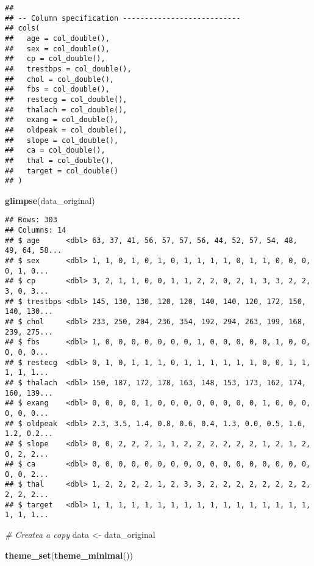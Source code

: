 \documentclass[
]{book}
\newenvironment{Shaded}{\begin{snugshade}}{\end{snugshade}}
\newcommand{\CommentTok}[1]{\textcolor[rgb]{0.56,0.35,0.01}{\textit{#1}}}
\newcommand{\KeywordTok}[1]{\textcolor[rgb]{0.13,0.29,0.53}{\textbf{#1}}}
\newcommand{\NormalTok}[1]{#1}
\newcommand{\StringTok}[1]{\textcolor[rgb]{0.31,0.60,0.02}{#1}}
\begin{document}
\begin{verbatim}
## 
## -- Column specification ---------------------------
## cols(
##   age = col_double(),
##   sex = col_double(),
##   cp = col_double(),
##   trestbps = col_double(),
##   chol = col_double(),
##   fbs = col_double(),
##   restecg = col_double(),
##   thalach = col_double(),
##   exang = col_double(),
##   oldpeak = col_double(),
##   slope = col_double(),
##   ca = col_double(),
##   thal = col_double(),
##   target = col_double()
## )
\end{verbatim}

\begin{Shaded}
\begin{Highlighting}[]
\KeywordTok{glimpse}\NormalTok{(data\_original)}
\end{Highlighting}
\end{Shaded}

\begin{verbatim}
## Rows: 303
## Columns: 14
## $ age      <dbl> 63, 37, 41, 56, 57, 57, 56, 44, 52, 57, 54, 48, 49, 64, 58...
## $ sex      <dbl> 1, 1, 0, 1, 0, 1, 0, 1, 1, 1, 1, 0, 1, 1, 0, 0, 0, 0, 1, 0...
## $ cp       <dbl> 3, 2, 1, 1, 0, 0, 1, 1, 2, 2, 0, 2, 1, 3, 3, 2, 2, 3, 0, 3...
## $ trestbps <dbl> 145, 130, 130, 120, 120, 140, 140, 120, 172, 150, 140, 130...
## $ chol     <dbl> 233, 250, 204, 236, 354, 192, 294, 263, 199, 168, 239, 275...
## $ fbs      <dbl> 1, 0, 0, 0, 0, 0, 0, 0, 1, 0, 0, 0, 0, 0, 1, 0, 0, 0, 0, 0...
## $ restecg  <dbl> 0, 1, 0, 1, 1, 1, 0, 1, 1, 1, 1, 1, 1, 0, 0, 1, 1, 1, 1, 1...
## $ thalach  <dbl> 150, 187, 172, 178, 163, 148, 153, 173, 162, 174, 160, 139...
## $ exang    <dbl> 0, 0, 0, 0, 1, 0, 0, 0, 0, 0, 0, 0, 0, 1, 0, 0, 0, 0, 0, 0...
## $ oldpeak  <dbl> 2.3, 3.5, 1.4, 0.8, 0.6, 0.4, 1.3, 0.0, 0.5, 1.6, 1.2, 0.2...
## $ slope    <dbl> 0, 0, 2, 2, 2, 1, 1, 2, 2, 2, 2, 2, 2, 1, 2, 1, 2, 0, 2, 2...
## $ ca       <dbl> 0, 0, 0, 0, 0, 0, 0, 0, 0, 0, 0, 0, 0, 0, 0, 0, 0, 0, 0, 2...
## $ thal     <dbl> 1, 2, 2, 2, 2, 1, 2, 3, 3, 2, 2, 2, 2, 2, 2, 2, 2, 2, 2, 2...
## $ target   <dbl> 1, 1, 1, 1, 1, 1, 1, 1, 1, 1, 1, 1, 1, 1, 1, 1, 1, 1, 1, 1...
\end{verbatim}

\begin{Shaded}
\begin{Highlighting}[]
\CommentTok{\# Createa a copy }
\NormalTok{data \textless{}{-}}\StringTok{ }\NormalTok{data\_original}

\KeywordTok{theme\_set}\NormalTok{(}\KeywordTok{theme\_minimal}\NormalTok{())}
\end{Highlighting}
\end{Shaded}
\end{document}

